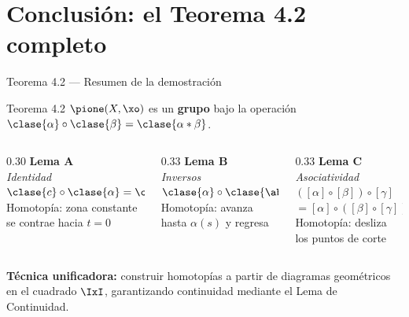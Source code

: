 \section{Conclusión: el Teorema 4.2 completo}

\begin{frame}{Teorema 4.2 — Resumen de la demostración}
  \begin{block}{Teorema 4.2}
    $\pione(X,\xo)$ es un \textbf{grupo} bajo la operación
    $\clase{\alpha}\circ\clase{\beta}=\clase{\alpha*\beta}$.
  \end{block}

  \bigskip
  \begin{columns}[T]
    \begin{column}{0.30\textwidth}
      \centering
      \textcolor{verdeTeal}{\textbf{Lema A}}\\[4pt]
      \textit{Identidad}\\[6pt]
      $\clase{c}\circ\clase{\alpha}=\clase{\alpha}$\\[4pt]
      Homotopía: zona constante se contrae hacia $t=0$
    \end{column}
    \begin{column}{0.33\textwidth}
      \centering
      \textcolor{morado}{\textbf{Lema B}}\\[4pt]
      \textit{Inversos}\\[6pt]
      $\clase{\alpha}\circ\clase{\abar}=\clase{c}$\\[4pt]
      Homotopía: avanza hasta $\alpha(s)$ y regresa
    \end{column}
    \begin{column}{0.33\textwidth}
      \centering
      \textcolor{coralOscuro}{\textbf{Lema C}}\\[4pt]
      \textit{Asociatividad}\\[6pt]
      $([\alpha]\circ[\beta])\circ[\gamma]$\\$=[\alpha]\circ([\beta]\circ[\gamma])$\\[4pt]
      Homotopía: desliza los puntos de corte
    \end{column}
  \end{columns}

  \bigskip
  \begin{center}
    \textbf{Técnica unificadora:} construir homotopías a partir de diagramas
    geométricos en el cuadrado $\IxI$, garantizando continuidad mediante el
    Lema de Continuidad.
  \end{center}
\end{frame}
